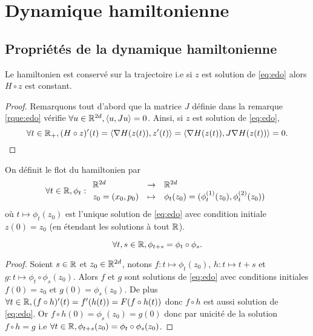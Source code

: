 \documentclass[10pt,a4paper]{article}
\begin{document}


\section{Dynamique hamiltonienne}

\subsection{Propriétés de la dynamique hamiltonienne}
\begin{Prop}\label{prop:conservation}
	Le hamiltonien est conservé sur la trajectoire i.e si $z$ est solution de \eqref{eq:edo} alors $H \circ z$ est constant.
\end{Prop}

\begin{proof}
	Remarquons tout d'abord que la matrice $J$ définie dans la remarque \ref{rque:edo} vérifie $\forall u \in \mathbb{R}^{2d}, { \left\langle u, Ju \right\rangle} = 0$. Ainsi, si $z$ est solution de \eqref{eq:edo},
	$$
	\forall t \in \mathbb{R}_+, (H \circ z)'(t) = { \left\langle \nabla H (z(t)), z'(t) \right\rangle} = { \left\langle \nabla H (z(t)), J \nabla H(z(t)) \right\rangle} = 0.
	$$
\end{proof}

\begin{Def}
	On définit le flot du hamiltonien par
	$$
	\forall t \in \mathbb{R}, \phi_t : { \begin{array}{lcl} 
		\mathbb{R}^{2d} & \to & \mathbb{R}^{2d} \\
		z_0 = (x_0, p_0) &\mapsto & \phi_t(z_0) = (\phi_t^{(1)}(z_0), \phi_t^{(2)}(z_0))
	 \end{array} }
	$$
	où $t \mapsto \phi_t(z_0)$ est l'unique solution de \eqref{eq:edo} avec condition initiale $z(0) = z_0$ (en étendant les solutions à tout $\mathbb{R}$).
\end{Def}

\begin{Pte}\label{prop:compo}
  $$
  \forall t, s \in \mathbb{R}, \phi_{t+s} = \phi_t \circ \phi_s.
  $$
\end{Pte}
\begin{proof}
  Soient $s \in \mathbb{R}$ et $z_0 \in \mathbb{R}^{2d}$, notons $f : t \mapsto \phi_{t}(z_0)$, $h : t \mapsto t+s$ et $g : t \mapsto \phi_t \circ \phi_s (z_0)$. Alors $f$ et $g$ sont solutions de \eqref{eq:edo} avec conditions initiales $f(0) = z_0$ et $g(0) = \phi_s(z_0)$. De plus $\forall t \in \mathbb{R}, (f\circ h)'(t) = f'(h(t)) = F(f \circ h(t))$ donc $f \circ h$ est aussi solution de \eqref{eq:edo}. Or $f \circ h (0) = \phi_s(z_0) = g(0)$ donc par unicité de la solution $f \circ h = g$ i.e $\forall t \in \mathbb{R}, \phi_{t+s}(z_0) = \phi_t \circ \phi_s (z_0)$. 
\end{proof}
\end{document}
